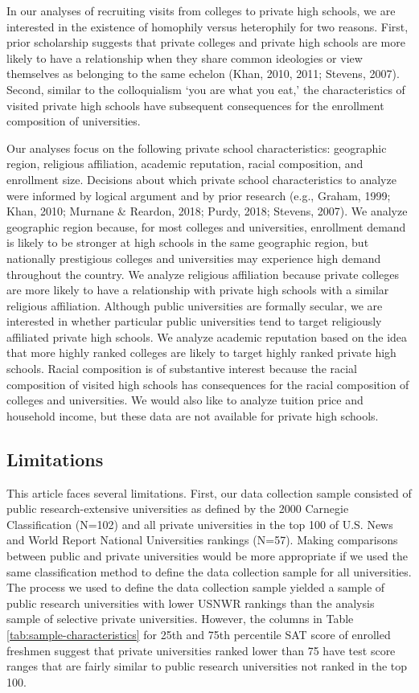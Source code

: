 \documentclass[
  12pt,
]{article}
\begin{document}
In our analyses of recruiting visits from colleges to private high schools, we are interested in the existence of homophily versus heterophily for two reasons. First, prior scholarship suggests that private colleges and private high schools are more likely to have a relationship when they share common ideologies or view themselves as belonging to the same echelon (Khan, 2010, 2011; Stevens, 2007). Second, similar to the colloquialism `you are what you eat,' the characteristics of visited private high schools have subsequent consequences for the enrollment composition of universities.

Our analyses focus on the following private school characteristics: geographic region, religious affiliation, academic reputation, racial composition, and enrollment size. Decisions about which private school characteristics to analyze were informed by logical argument and by prior research (e.g., Graham, 1999; Khan, 2010; Murnane \& Reardon, 2018; Purdy, 2018; Stevens, 2007). We analyze geographic region because, for most colleges and universities, enrollment demand is likely to be stronger at high schools in the same geographic region, but nationally prestigious colleges and universities may experience high demand throughout the country. We analyze religious affiliation because private colleges are more likely to have a relationship with private high schools with a similar religious affiliation. Although public universities are formally secular, we are interested in whether particular public universities tend to target religiously affiliated private high schools. We analyze academic reputation based on the idea that more highly ranked colleges are likely to target highly ranked private high schools. Racial composition is of substantive interest because the racial composition of visited high schools has consequences for the racial composition of colleges and universities. We would also like to analyze tuition price and household income, but these data are not available for private high schools.

\subsection{Limitations}\label{limitations}

This article faces several limitations. First, our data collection sample consisted of public research-extensive universities as defined by the 2000 Carnegie Classification (N=102) and all private universities in the top 100 of U.S. News and World Report National Universities rankings (N=57). Making comparisons between public and private universities would be more appropriate if we used the same classification method to define the data collection sample for all universities. The process we used to define the data collection sample yielded a sample of public research universities with lower USNWR rankings than the analysis sample of selective private universities. However, the columns in Table \ref{tab:sample-characteristics} for 25th and 75th percentile SAT score of enrolled freshmen suggest that private universities ranked lower than 75 have test score ranges that are fairly similar to public research universities not ranked in the top 100.
\end{document}
